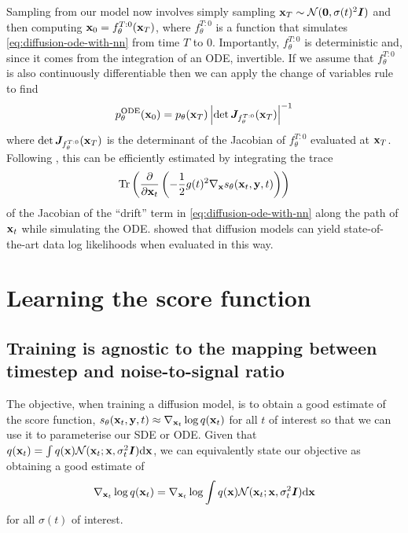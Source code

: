Sampling from our model now involves simply sampling ${\mathbf{x}}_T \sim {\mathcal{N}}({\bm{0}}, \sigma(t)^2{\bm{I}})$ and then computing ${\mathbf{x}}_0 = f^{T:0}_\theta({\mathbf{x}}_T)$, where $f^{T:0}_\theta$ is a function that simulates \cref{eq:diffusion-ode-with-nn} from time $T$ to $0$. Importantly, $f^{T:0}_\theta$ is deterministic and, since it comes from the integration of an ODE, invertible. If we assume that $f^{T:0}_\theta$ is also continuously differentiable then we can apply the change of variables rule to find
\begin{equation}
    p_\theta^\text{ODE}({\mathbf{x}}_0) = p_\theta({\mathbf{x}}_T) \left| \det {\bm{J}}_{f^{T:0}_\theta}({\mathbf{x}}_T) \right|^{-1}
\end{equation}
where $\det {\bm{J}}_{f^{T:0}_\theta}({\mathbf{x}}_T)$ is the determinant of the Jacobian of $f^{T:0}_\theta$ evaluated at ${\mathbf{x}}_T$. Following \citet{chen2018neural}, this can be efficiently estimated by integrating the trace
\begin{equation}
    \text{Tr}\left( \frac{\partial}{\partial {\mathbf{x}}_t} \left( - \frac{1}{2} g(t)^2 \nabla_{\mathbf{x}} s_\theta({\mathbf{x}}_t, {\mathbf{y}}, t) \right)
    \right)
\end{equation}
of the Jacobian of the ``drift'' term in \cref{eq:diffusion-ode-with-nn} along the path of ${\mathbf{x}}_t$ while simulating the ODE. \citet{song2020score} showed that diffusion models can yield state-of-the-art data log likelihoods when evaluated in this way.




\section{Learning the score function} \label{sec:diffusion-training}

\subsection{Training is agnostic to the mapping between timestep and noise-to-signal ratio}
The objective, when training a diffusion model, is to obtain a good estimate of the score function, $s_\theta({\mathbf{x}}_t, {\mathbf{y}}, t) \approx \nabla_{{\mathbf{x}}_t} \log q({\mathbf{x}}_t)$ for all $t$ of interest so that we can use it to parameterise our SDE or ODE. Given that $q({\mathbf{x}}_t) = \int q({\mathbf{x}}) {\mathcal{N}}({\mathbf{x}}_t; {\mathbf{x}}, \sigma_t^2{\bm{I}}) \mathrm{d}{\mathbf{x}}$, we can equivalently state our objective as obtaining a good estimate of 
\begin{equation}
\nabla_{{\mathbf{x}}_t} \log q({\mathbf{x}}_t) = \nabla_{{\mathbf{x}}_t} \log \int q({\mathbf{x}}) {\mathcal{N}}({\mathbf{x}}_t; {\mathbf{x}}, \sigma_t^2{\bm{I}}) \mathrm{d}{\mathbf{x}}
\end{equation}
for all $\sigma(t)$ of interest.

